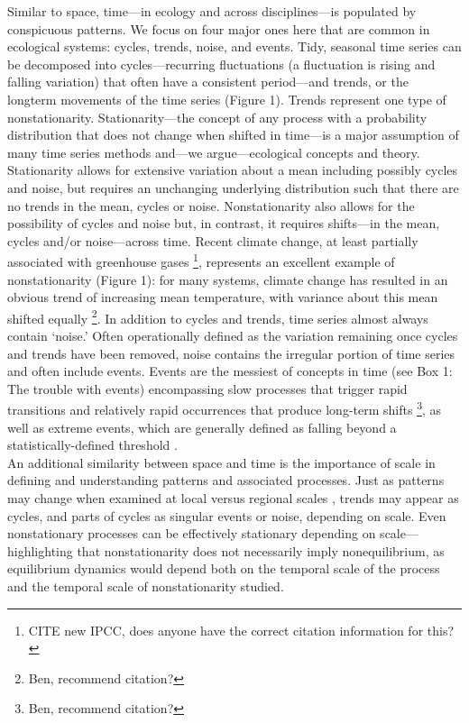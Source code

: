 \documentclass[11pt,a4paper,oneside]{article}
\begin{document}
Similar to space, time---in ecology and across disciplines---is populated by conspicuous patterns. We focus on four major ones here that are common in ecological systems: cycles, trends, noise, and events. Tidy, seasonal time series can be decomposed into cycles---recurring fluctuations (a fluctuation is rising and falling variation) that often have a consistent period---and trends, or the longterm movements of the time series (Figure 1). Trends represent one type of nonstationarity. Stationarity---the concept of any process with a probability distribution that does not change when shifted in time---is a major assumption of many time series methods and---we argue---ecological concepts and theory. Stationarity allows for extensive variation about a mean including possibly cycles and noise, but requires an unchanging underlying distribution such that there are no trends in the mean, cycles or noise. Nonstationarity also allows for the possibility of cycles and noise but, in contrast, it requires shifts---in the mean, cycles and/or noise---across time. Recent climate change, at least partially associated with greenhouse gases \footnote{CITE new IPCC, does anyone have the correct citation information for this?}, represents an excellent example of nonstationarity (Figure 1): for many systems, climate change has resulted in an obvious trend of increasing mean temperature, with variance about this mean shifted equally \footnote{Ben, recommend citation?}. In addition to cycles and trends, time series almost always contain `noise.' Often operationally defined as the variation remaining once cycles and trends have been removed, noise contains the irregular portion of time series and often include events. Events are the messiest of concepts in time (see Box 1: The trouble with events) encompassing slow processes that trigger rapid transitions \citep{Foley2003} and relatively rapid occurrences that produce long-term shifts \footnote{Ben, recommend citation?}, as well as extreme events, which are generally defined as falling beyond a statistically-defined threshold \citep{ipccextreme2012}.\\

An additional similarity between space and time is the importance of scale in defining and understanding patterns and associated processes. Just as patterns may change when examined at local versus regional scales \citep[e.g.,][]{Fridley:2007ct}, trends may appear as cycles, and parts of cycles as singular events or noise, depending on scale. Even nonstationary processes can be effectively stationary depending on scale---highlighting that nonstationarity does not necessarily imply nonequilibrium, as equilibrium dynamics would depend both on the temporal scale of the process and the temporal scale of nonstationarity studied.\\
\end{document}
